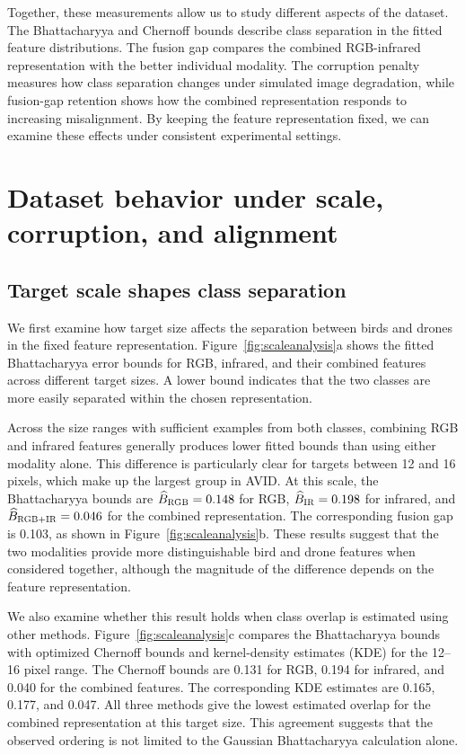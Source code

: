 \documentclass[10pt]{article}
\newcommand{\dataset}{\textsc{AVID}}
\newcommand{\rgb}{\textsc{RGB}}
\newcommand{\ir}{\textsc{IR}}
\newcommand{\Bhat}{\widehat B}
\begin{document}
Together, these measurements allow us to study different aspects of the dataset. The Bhattacharyya and Chernoff bounds describe class separation in the fitted feature distributions. The fusion gap compares the combined RGB-infrared representation with the better individual modality. The corruption penalty measures how class separation changes under simulated image degradation, while fusion-gap retention shows how the combined representation responds to increasing misalignment. By keeping the feature representation fixed, we can examine these effects under consistent experimental settings.


\section{Dataset behavior under scale, corruption, and alignment}
\label{sec:findings}

\subsection{Target scale shapes class separation}

We first examine how target size affects the separation between birds and drones in the fixed feature representation. Figure~\ref{fig:scaleanalysis}a shows the fitted Bhattacharyya error bounds for RGB, infrared, and their combined features across different target sizes. A lower bound indicates that the two classes are more easily separated within the chosen representation.

Across the size ranges with sufficient examples from both classes, combining RGB and infrared features generally produces lower fitted bounds than using either modality alone. This difference is particularly clear for targets between 12 and 16 pixels, which make up the largest group in \dataset{}. At this scale, the Bhattacharyya bounds are $\Bhat_{\rgb}=0.148$ for RGB, $\Bhat_{\ir}=0.198$ for infrared, and $\Bhat_{\rgb+\ir}=0.046$ for the combined representation. The corresponding fusion gap is 0.103, as shown in Figure~\ref{fig:scaleanalysis}b. These results suggest that the two modalities provide more distinguishable bird and drone features when considered together, although the magnitude of the difference depends on the feature representation.

We also examine whether this result holds when class overlap is estimated using other methods. Figure~\ref{fig:scaleanalysis}c compares the Bhattacharyya bounds with optimized Chernoff bounds and kernel-density estimates (KDE) for the 12--16 pixel range. The Chernoff bounds are 0.131 for RGB, 0.194 for infrared, and 0.040 for the combined features. The corresponding KDE estimates are 0.165, 0.177, and 0.047. All three methods give the lowest estimated overlap for the combined representation at this target size. This agreement suggests that the observed ordering is not limited to the Gaussian Bhattacharyya calculation alone.
\end{document}
